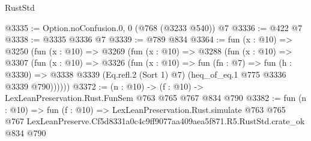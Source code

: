 \begin{lexlean}{RustStd}
\begin{coremodule}
@3335 := Option.noConfusion.{0, 0} (@768 (@3233 @540)) @7
@3336 := @422 @7
@3338 := @3335 @3336 @7
@3339 := @789 @834
@3364 := fun (x : @10) =>
  @3250
    (fun (x : @10) =>
    @3269
      (fun (x : @10) =>
      @3288
        (fun (x : @10) =>
        @3307
          (fun (x : @10) =>
          @3326
            (fun (x : @10) =>
            fun (fn : @7) =>
            fun (h : @3330) =>
            @3338 @3339 (Eq.refl.{2} (Sort 1) @7) (heq_of_eq.{1} @775 @3336 @3339 @790))))))
@3372 := (n : @10) -> (f : @10) -> LexLeanPreservation.Rust.FunSem @763 @765 @767 @834 @790
@3382 := fun (n : @10) =>
  fun (f : @10) =>
  LexLeanPreservation.Rust.simulate
    @763
    @765
    @767
    LexLeanPreserve.Cf5d8331a0c4c9ff9077aa409aea5f871.R5.RustStd.crate_ok
    @834
    @790
\end{coremodule}
\end{lexlean}
